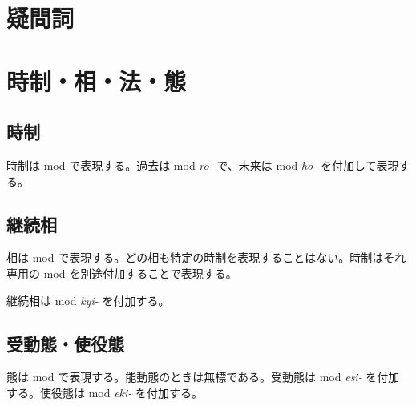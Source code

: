 \section{疑問詞}

\section{時制・相・法・態}

\subsection{時制}

時制は mod で表現する。過去は mod \emph{ro-} で、未来は mod \emph{ho-} を付加して表現する。

\subsection{継続相}

相は mod で表現する。どの相も特定の時制を表現することはない。時制はそれ専用の mod を別途付加することで表現する。

継続相は mod \emph{kyi-} を付加する。

\subsection{受動態・使役態}

態は mod で表現する。能動態のときは無標である。受動態は mod \emph{esi-} を付加する。使役態は mod \emph{eki-} を付加する。